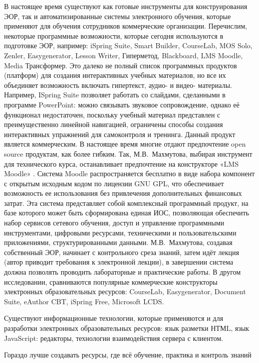 В настоящее время существуют как готовые инструменты для конструирования ЭОР, так и автоматизированные системы электронного обучения, которые применяют для обучения сотрудников коммерческие организации.
Перечислим, некоторые программные возможности, которые сегодня используются в подготовке ЭОР, например: iSpring Suite, Smart Builder, CourseLab, MOS Solo, Zenler, Easygenerator, Lesson Writer, Гиперметод, Blackboard, LMS Moodle, Media Трансформер.
Это далеко не полный список программных продуктов (платформ) для создания интерактивных учебных материалов, но все их объединяет возможность включать гипертекст, аудио- и видео- материалы. Например, ISpring Suite позволяет работать со слайдами, сделанными в программе PowerPoint: можно связывать звуковое сопровождение, однако её функционал недостаточен, поскольку учебный материал представлен с преимущественно линейной навигацией, ограничены способы создания интерактивных упражнений для самоконтроля и тренинга. Данный продукт является коммерческим. В настоящее время многие отдают предпочтение open source продуктам, как более гибким. Так, М.В.~Махмутова, выбирая инструмент для технического курса, останавливает предпочтение на конструкторе «LMS Moodle» \cite{mahmutova19, larin}. 
Система Moodle распространяется бесплатно в виде набора компонент с открытым исходным кодом по лицензии GNU GPL, что обеспечивает возможность ее использования без привлечения дополнительных финансовых затрат. Эта система представляет собой комплексный программный продукт, на базе которого может быть сформирована единая ИОС, позволяющая обеспечить набор сервисов сетевого обучения, доступ и управление программными инструментами, цифровыми ресурсами, техническими и пользовательскими приложениями, структурированными данными. М.В.~Махмутова, создавая собственный ЭОР, начинает с контрольного среза знаний, затем идёт лекция (автор приводит требования к электронной лекции), в завершении система должна позволять проводить лабораторные и практические работы.
В другом исследовании\cite{dementeva17}, сравниваются популярные коммерческие конструкторы электронных образовательных ресурсов: CourseLab, Easygenerator, Document Suite, eAuthor CBT, iSpring Free, Microsoft LCDS.

Существуют информационные технологии, которые применяются и для разработки электронных образовательных ресурсов: язык разметки НТМL, язык JavaScript: редакторы, технологии взаимодействия сервера с клиентом\cite[С. 154.]{dementeva17}.

Гораздо лучше создавать ресурсы, где всё обучение, практика и контроль знаний 

